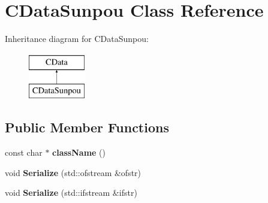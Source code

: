 \hypertarget{classCDataSunpou}{\section{C\-Data\-Sunpou Class Reference}
\label{classCDataSunpou}
}
Inheritance diagram for C\-Data\-Sunpou\-:\begin{figure}[H]
\begin{center}
\leavevmode
\includegraphics[height=2.000000cm]{classCDataSunpou}
\end{center}
\end{figure}
\subsection*{Public Member Functions}
\begin{DoxyCompactItemize}
\item 
\hypertarget{classCDataSunpou_a1e1c8d023126c3eb6a06252ed10bbe77}{const char $\ast$ {\bfseries class\-Name} ()}\label{classCDataSunpou_a1e1c8d023126c3eb6a06252ed10bbe77}

\item 
\hypertarget{classCDataSunpou_a32c164cd570dd20616e280b27141170c}{void {\bfseries Serialize} (std\-::ofstream \&ofstr)}\label{classCDataSunpou_a32c164cd570dd20616e280b27141170c}

\item 
\hypertarget{classCDataSunpou_a82335307eaed24b2c25e692810af14ae}{void {\bfseries Serialize} (std\-::ifstream \&ifstr)}\label{classCDataSunpou_a82335307eaed24b2c25e692810af14ae}

\end{DoxyCompactItemize}
